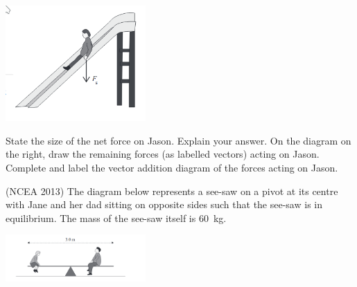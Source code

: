 \documentclass[a4paper]{exam}
\begin{document}
\begin{questions}
\begin{parts}
              \includegraphics[width=0.4\textwidth]{nzqa20131}
          \begin{subparts}
            \subpart State the size of the net force on Jason. Explain your answer.
            \subpart On the diagram on the right, draw the remaining
                     forces (as labelled vectors) acting on Jason.
            \subpart Complete and label the vector addition
                     diagram of the forces acting on Jason.
          \end{subparts}
      \end{parts}
    \question (NCEA 2013) The diagram below represents a see-saw on a pivot at its centre with Jane and her dad sitting on
              opposite sides such that the see-saw is in equilibrium. The mass of the see-saw itself is \SI{60}{\kilo\gram}.

              \includegraphics[width=0.4\textwidth]{nzqa201321}
\end{questions}
\end{document}
